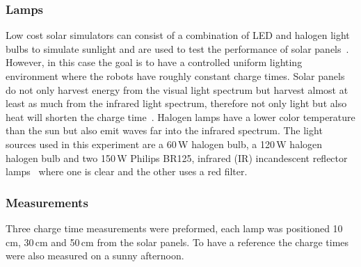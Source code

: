 \begin{table}[t]
	\centering
	\caption{Specification of the solar panels tested in the experiment.}
	\label{tab:solar_panels}
\end{table}


\subsubsection{Lamps}
Low cost solar simulators can consist of a combination of LED and halogen light bulbs to simulate sunlight and are used to test the performance of solar panels~\cite{grandi_tia_2014}.
However, in this case the goal is to have a controlled uniform lighting environment where the robots have roughly constant charge times.
Solar panels do not only harvest energy from the visual light spectrum but harvest almost at least as much from the infrared light spectrum, therefore not only light but also heat will shorten the charge time~\cite{ixolar_slmd121h04l_2017}.
Halogen lamps have a lower color temperature than the sun but also emit waves far into the infrared spectrum.
The light sources used in this experiment are a 60\,W halogen bulb, a 120\,W halogen halogen bulb and two 150\,W Philips  BR125, infrared (IR) incandescent reflector lamps~\cite{philips_irlamp_2017} where one is clear and the other uses a red filter.

\subsubsection{Measurements}
Three charge time measurements were preformed, each lamp was positioned 10\,cm, 30\,cm and 50\,cm from the solar panels.
To have a reference the charge times were also measured on a sunny afternoon. 

